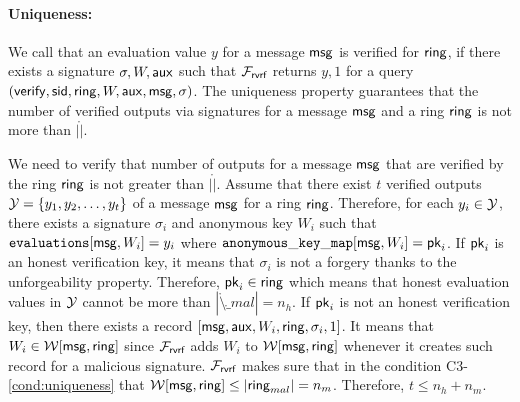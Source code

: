 \paragraph{Uniqueness:} We call that an evaluation value $ y $ for a message $ \mathsf{msg} $  is verified for $ \mathsf{ring} $, if there exists a signature $ \sigma, W,\mathsf{aux} $ such that $ \mathcal{F}_{\textsf{rvrf}}$ returns $ y, 1$ for a query $ (\mathsf{verify}, \textsf{sid}, \mathsf{ring},W,\mathsf{aux},\mathsf{msg},\sigma)$. The uniqueness property guarantees that the number of verified outputs via signatures for a message $ \mathsf{msg} $ and a ring $ \mathsf{ring} $ is not more than $ |\ring| $.

We need to verify that number of outputs for a message $ \mathsf{msg} $ that are verified by the ring $ \mathsf{ring} $ is not greater than $ |\ring| $.
Assume that there exist $ t$ verified outputs $ {\mathcal{Y}} = \{y_1, y_2, \ldots, y_t\} $ of a message $ \mathsf{msg} $ for a ring $ \mathsf{ring} $. Therefore, for each $ y_i \in {\ensuremath{\mathcal{Y}}} $, there exists a signature $ \sigma_i $ and anonymous key $ W_i $ such that  $\texttt{evaluations}[\mathsf{msg},W_i] = y_i $ where $ \mathtt{anonymous\_key\_map}[\mathsf{msg},W_i] = \mathsf{pk}_i $. If $ \mathsf{pk}_i $ is an honest verification key, it means that $ \sigma_i $ is not a forgery  thanks to the unforgeability property. Therefore, $ \mathsf{pk}_i \in \mathsf{ring} $ which means that honest evaluation values in $ {\mathcal{Y}} $ cannot be more than $ |\ring \setminus \ring_{mal}| = n_h $. If $ \mathsf{pk}_i $ is not an honest verification key, then there exists a record $ [\mathsf{msg}, \mathsf{aux}, W_i,\mathsf{ring},\sigma_i,1] $. It means that $ W_i \in \mathcal{W}[\mathsf{msg},\mathsf{ring}] $ since $ \mathcal{F}_{\textsf{rvrf}} $ adds $ W_i $ to $ \mathcal{W}[\mathsf{msg}, \mathsf{ring}] $ whenever it creates such record for a malicious signature. $ \mathcal{F}_{\textsf{rvrf}} $ makes sure that in the condition C3-\ref{cond:uniqueness} that $ \mathcal{W}[\mathsf{msg},\mathsf{ring}] \leq |\mathsf{ring}_{mal}| = n_m$. Therefore, $ t \leq n_h + n_m $.
%
%
